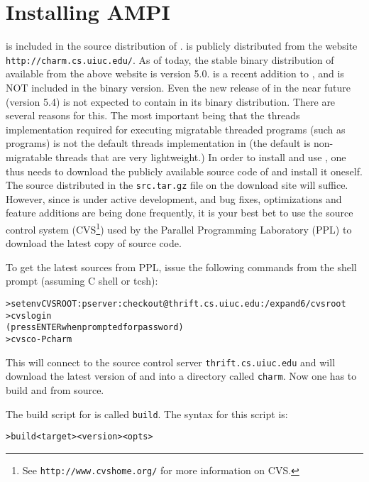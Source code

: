\documentclass[10pt]{article}
\begin{document}
\appendix

\section{Installing AMPI}

\ampi{} is included in the source distribution of \charmpp{}. \charmpp{} is
publicly distributed from the website \verb+http://charm.cs.uiuc.edu/+.  As of
today, the stable binary distribution of \charmpp{} available from the above
website is version 5.0. \ampi{} is a recent addition to \charmpp{}, and is NOT
included in the binary version. Even the new release of \charmpp{} in the near
future (version 5.4) is not expected to contain \ampi{} in its binary
distribution. There are several reasons for this. The most important being that
the threads implementation required for executing migratable threaded programs
(such as \ampi{} programs) is not the default threads implementation in
\charmpp{} (the default is non-migratable threads that are very lightweight.)
In order to install and use \ampi{}, one thus needs to download the publicly
available source code of \charmpp{} and install it oneself. The source
distributed in the \verb+src.tar.gz+ file on the download site will suffice.
However, since \ampi{} is under active development, and bug fixes,
optimizations and feature additions are being done frequently, it is your best
bet to use the source control system (CVS\footnote{See
\texttt{http://www.cvshome.org/} for more information on CVS.}) used by the
Parallel Programming Laboratory (PPL) to download the latest copy of \charmpp{}
source code.

To get the latest sources from PPL, issue the following commands from the shell
prompt (assuming C shell or tcsh):

\begin{alltt}
> setenv CVSROOT :pserver:checkout@thrift.cs.uiuc.edu:/expand6/cvsroot
> cvs login
(press ENTER when prompted for password)
> cvs co -P charm
\end{alltt}

This will connect to the source control server \verb+thrift.cs.uiuc.edu+ and
will download the latest version of \charmpp{} and \ampi{} into a directory
called \texttt{charm}. Now one has to build \charmpp{} and \ampi{} from source.

The build script for \charmpp{} is called \texttt{build}. The syntax for this
script is:

\begin{alltt}
> build <target> <version> <opts>
\end{alltt}
\end{document}
